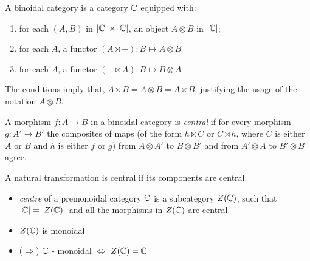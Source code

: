 \begin{frame}
\begin{definition}
    A binoidal category is a category $\mathbb{C}$ equipped with:
    \begin{enumerate}
        \item for each $(A, B)$ in $|\mathbb{C}| \times |\mathbb{C}|$, an object $A \otimes B$
            in $|\mathbb{C}|$;
        \item for each $A$, a functor $(A \rtimes -) : B \mapsto A \otimes B$
        \item for each $A$, a functor $(- \ltimes A) : B \mapsto B \otimes A$
    \end{enumerate}
\end{definition}

The conditions imply that, $A \rtimes B = A \otimes B = A \ltimes B$,
justifying the usage of the notation $A \otimes B$.
\end{frame}

\begin{frame}
\begin{definition}
    A morphism $f: A \to B$ in a binoidal category is \emph{central} if for
    every morphism $g: A' \to B'$ the composites of maps (of the form $h
    \ltimes C$ or $C \rtimes h$, where $C$ is either $A$ or $B$ and $h$ is
    either $f$ or $g$) from $A \otimes A'$ to $B \otimes B'$ and from $A'
    \otimes A$ to $B' \otimes B$ agree.
\end{definition}
A natural transformation is central if its components are central.
\end{frame}


\begin{frame}
\begin{itemize}
    \item \emph{centre} of a premonoidal category $\mathbb{C}$ is a subcategory
        $Z(\mathbb{C})$, such that $|\mathbb{C}| = |Z(\mathbb{C})|$ and all the morphisms in
        $Z(\mathbb{C})$ are central.

    \item $Z(\mathbb{C})$ is monoidal

    \item ($\Rightarrow$) $\mathbb{C}$ - monoidal $\iff$ $Z(\mathbb{C}) = \mathbb{C}$
\end{itemize}
\end{frame}

